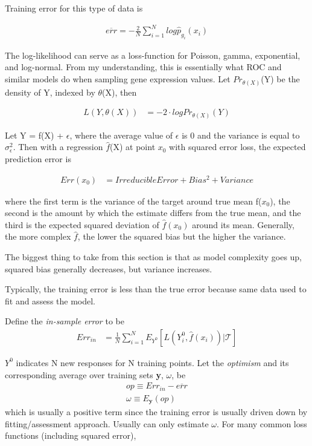 \documentclass[11pt]{labbook}
\newcommand{\Loss}[2]{L\left(#1,#2\right)}
\begin{document}
Training error for this type of data is 

\begin{align*}
\overline{err} = -\frac{2}{N}\sum_{i=1}^{N}log\hat{p}_{g_i}(x_i)
\end{align*}

The log-likelihood can serve as a loss-function for Poisson, gamma, exponential, and log-normal. From my understanding, this is essentially what ROC and similar models do when sampling gene expression values. Let $Pr_{\theta\left(X\right)}$(Y) be the density of Y, indexed by $\theta$(X), then

\begin{align*}
\Loss{Y}{\theta(X)} &= -2 \cdot logPr_{\theta\left(X\right)}(Y)
\end{align*}

Let Y = f(X) + $\epsilon$, where the average value of $\epsilon$ is 0 and the variance is equal to $\sigma_\epsilon^2$. Then with a regression $\hat{f}$(X) at point $x_0$ with squared error loss, the expected prediction error is 

\begin{align*}
Err(x_0) &= Irreducible Error + Bias^2 + Variance
\end{align*}

where the first term is the variance of the target around true mean f($x_0$), the second is the amount by which the estimate differs from the true mean, and the third is the expected squared deviation of $\hat{f}(x_0)$ around its mean. Generally, the more complex $\hat{f}$, the lower the squared bias but the higher the variance. 

The biggest thing to take from this section is that as model complexity goes up, squared bias generally decreases, but variance increases. 


Typically, the training error is less than the true error because same data used to fit and assess the model. 

Define the \textit{in-sample error} to be
\begin{align*}
Err_{in} &= \frac{1}{N}\sum_{i=1}^{N}E_{Y^0}\left[\Loss{Y_i^0}{\hat{f}(x_i)}|\mathcal{T}\right]
\end{align*}

$Y^0$ indicates N new responses for N training points. Let the \textit{optimism} and its corresponding average over training sets \textbf{y}, $\omega$, be
\begin{align*}
op \equiv Err_{in} -\overline{err} \\
\omega \equiv E_{\textbf{y}}(op)
\end{align*}
which is usually a positive term since the training error is usually driven down by fitting/assessment approach. Usually can only estimate $\omega$. For many common loss functions (including squared error),
\end{document}

